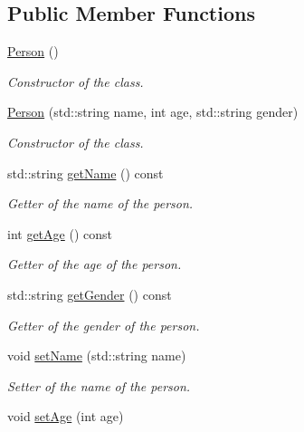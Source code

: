 \subsection*{Public Member Functions}
\begin{DoxyCompactItemize}
\item 
\mbox{\label{class_person_a0397c6f89fafc12e738923f612bc41a3}} 
\mbox{\hyperlink{class_person_a0397c6f89fafc12e738923f612bc41a3}{Person}} ()
\begin{DoxyCompactList}\small\item\em Constructor of the class. \end{DoxyCompactList}\item 
\mbox{\hyperlink{class_person_a19ba5bb7e92c776268b3d453b4ef55b2}{Person}} (std\+::string name, int age, std\+::string gender)
\begin{DoxyCompactList}\small\item\em Constructor of the class. \end{DoxyCompactList}\item 
std\+::string \mbox{\hyperlink{class_person_a9db2e2ccfc6cfa0d7979613ec2aaa922}{get\+Name}} () const
\begin{DoxyCompactList}\small\item\em Getter of the name of the person. \end{DoxyCompactList}\item 
int \mbox{\hyperlink{class_person_a4b66dbee570398920b8fb6aacddd2559}{get\+Age}} () const
\begin{DoxyCompactList}\small\item\em Getter of the age of the person. \end{DoxyCompactList}\item 
std\+::string \mbox{\hyperlink{class_person_a3abba7ffeabffb247ec36230df68cec4}{get\+Gender}} () const
\begin{DoxyCompactList}\small\item\em Getter of the gender of the person. \end{DoxyCompactList}\item 
void \mbox{\hyperlink{class_person_ad6e438f456d3ae6f5b477931c0a6aeba}{set\+Name}} (std\+::string name)
\begin{DoxyCompactList}\small\item\em Setter of the name of the person. \end{DoxyCompactList}\item 
void \mbox{\hyperlink{class_person_ac8ade54c27a0657c987c395ff04a9d46}{set\+Age}} (int age)

\end{DoxyCompactItemize}

